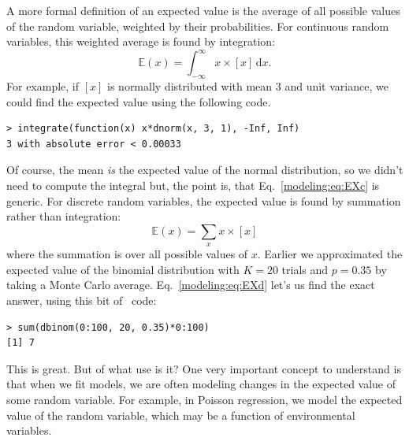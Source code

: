 A more formal definition of an expected value is the average of all
possible values of the random variable, weighted by their
probabilities. For continuous random variables, this weighted average
is found by integration:
\begin{equation}
  \mathbb{E}(x) = \int_{-\infty}^{\infty} x \times [x] \, \text{d}{x}.
  \label{modeling:eq:EXc}
\end{equation}
For example, if $[x]$ is normally distributed with mean 3 and unit
variance, we could find the expected value using the following code.
\begin{verbatim}
> integrate(function(x) x*dnorm(x, 3, 1), -Inf, Inf)
3 with absolute error < 0.00033
\end{verbatim}
Of course, the mean \textit{is} the expected value of the normal
distribution, so we didn't need to compute the integral but, the
point is, that Eq.~\ref{modeling:eq:EXc} is generic. For discrete
random variables, the expected value is found by summation rather than
integration:
\begin{equation}
  \mathbb{E}(x) = \sum_{x} x \times [x]
  \label{modeling:eq:EXd}
\end{equation}
where the summation is over all possible values of $x$.
Earlier we
approximated the expected value of the binomial distribution
with $K=20$ trials and $p=0.35$ by taking a Monte Carlo
average. Eq.~\ref{modeling:eq:EXd} let's us
find the exact answer, using this bit of \R~code:
\begin{verbatim}
> sum(dbinom(0:100, 20, 0.35)*0:100)
[1] 7
\end{verbatim}
This is great. But of what use is it? One very
important concept to understand is that when we fit
models, we are often modeling changes in the expected value of some random
variable. For example, in Poisson regression, we model the expected
value of the random variable, which may be a function
of environmental variables.

